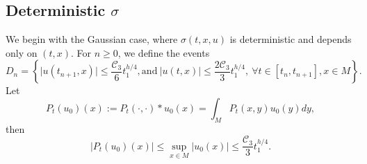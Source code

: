 \documentclass[12pt]{amsart}
\numberwithin{equation}{section}
\newcommand{\1}{\mathbf{1}}
\begin{document}
\subsection*{Deterministic $\sigma$}
We begin with the Gaussian case, where $\sigma(t,x,u)$ is deterministic and depends only on $(t,x)$. For $n \geq 0$, we define the events
\begin{equation}
\label{Dsequence}
D_n=\left\lbrace\vert u(t_{n+1},x)\vert\leq \frac{\mathcal{C}_3}{6}t_1^{h/4},\text{and}~\vert u(t,x)\vert\leq \frac{2\mathcal{C}_3}{3}t_1^{h/4},~\forall t\in[t_n,t_{n+1}],x\in M\right\rbrace.
\end{equation}
Let
\[P_t(u_0)(x):=P_{t}(\cdot,\cdot)*u_0(x)=\int_{M}P_{t}(x,y)u_0(y)dy,\]
then
\begin{equation}
\label{u0convolute}
\vert P_t(u_0)(x)\vert\leq \sup_{x\in M}\vert u_0(x)\vert\leq \frac{\mathcal{C}_3}{3}t_1^{h/4}.
\end{equation}
\end{document}
